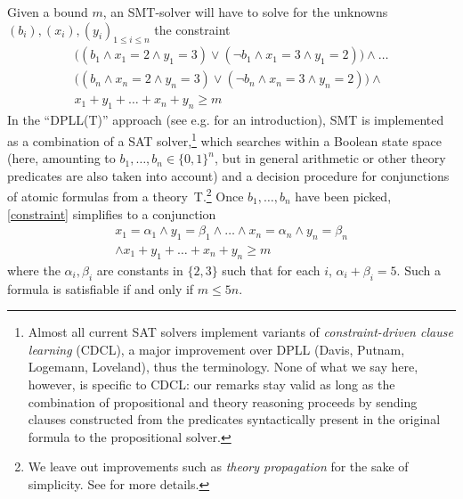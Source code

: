 \documentclass[a4paper,twocolumn,11pt]{article}
\begin{document}
Given a bound $m$, an SMT-solver will have to solve for the unknowns
$(b_i), \allowbreak (x_i), \allowbreak (y_i)_{1 \leq i \leq n}$ the constraint
{\small
\begin{multline}\label{constraint}
\big((b_1 \land x_1=2 \land y_1=3) \lor (\neg b_1 \land x_1=3 \land y_1=2)\big) \land \dots\\
\big((b_n \land x_n=2 \land y_n=3) \lor (\neg b_n \land x_n=3 \land y_n=2)\big) \land \\
x_1 + y_1 + \dots + x_n + y_n \geq m
\end{multline}}
In the ``DPLL(T)'' approach (see e.g. \textcite{Kroening_Strichman} for an introduction), SMT is implemented as a combination of a SAT solver,\footnote{Almost all current SAT solvers implement variants of \emph{constraint-driven clause learning} (CDCL), a major improvement over DPLL (Davis, Putnam, Logemann, Loveland), thus the terminology. None of what we say here, however, is specific to CDCL: our remarks stay valid as long as the combination of propositional and theory reasoning proceeds by sending clauses constructed from the predicates syntactically present in the original formula to the propositional solver.}
which searches within a Boolean state space (here, amounting to $b_1,\dots,b_n \in \{0,1\}^n$, but in general arithmetic or other theory predicates are also taken into account) and a decision procedure for conjunctions of atomic formulas from a theory~T.\footnote{We leave out improvements such as \emph{theory propagation} for the sake of simplicity. See \textcite{Kroening_Strichman} for more details.}
Once $b_1,\dots,b_n$ have been picked, \autoref{constraint} simplifies to a conjunction
\begin{multline}\label{conj:diamond_cube}
x_1=\alpha_1 \land y_1=\beta_1 \land \allowbreak
\dots \allowbreak \land \allowbreak
x_n=\alpha_n \land y_n=\beta_n \allowbreak\\
\land \allowbreak
x_1 + y_1 + \dots + x_n + y_n \geq m
\end{multline}
where the $\alpha_i,\beta_i$ are constants in $\{2,3\}$ such that for each $i$,
$\alpha_i + \beta_i = 5$.
Such a formula is satisfiable if and only if $m \leq 5n$.
\end{document}
